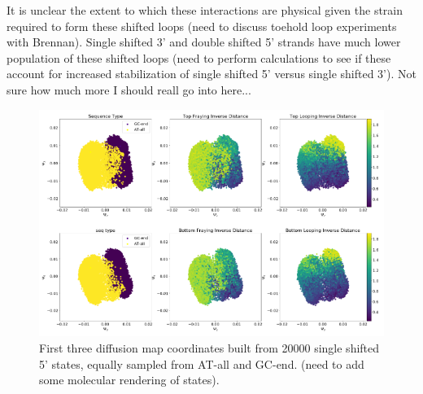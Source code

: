 \documentclass[journal=jpcbfk,manuscript=article]{achemso}
\begin{document}
It is unclear the extent to which these interactions are physical given the strain required to form these shifted loops (need to discuss toehold loop experiments with Brennan).  Single shifted 3' and double shifted 5' strands have much lower population of these shifted loops (need to perform calculations to see if these account for increased stabilization of single shifted 5' versus single shifted 3'). Not sure how much more I should reall go into here...

\begin{figure}[ht!]
	\begin{center}
        \includegraphics[width=\textwidth]{Figs/figs_0804/diff_maps_full.png}
        \caption{First three diffusion map coordinates built from 20000 single shifted 5' states, equally sampled from AT-all and GC-end. (need to add some molecular rendering of states).}
        \label{fig:shifting_distributions}
	\end{center}
\end{figure}
\end{document}
